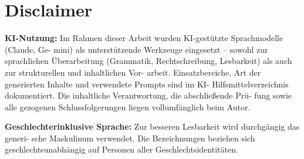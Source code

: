 \section*{Disclaimer}

\textbf{KI-Nutzung:} Im Rahmen dieser Arbeit wurden KI-gestützte Sprachmodelle (Claude, Ge-
mini) als unterstützende Werkzeuge eingesetzt – sowohl zur sprachlichen Überarbeitung
(Grammatik, Rechtschreibung, Lesbarkeit) als auch zur strukturellen und inhaltlichen Vor-
arbeit. Einsatzbereiche, Art der generierten Inhalte und verwendete Prompts sind im KI-
Hilfsmittelverzeichnis dokumentiert. Die inhaltliche Verantwortung, die abschließende Prü-
fung sowie alle gezogenen Schlussfolgerungen liegen vollumfänglich beim Autor.

\textbf{Geschlechterinklusive Sprache:} Zur besseren Lesbarkeit wird durchgängig das generi-
sche Maskulinum verwendet. Die Bezeichnungen beziehen sich geschlechtsunabhängig
auf Personen aller Geschlechtsidentitäten.
